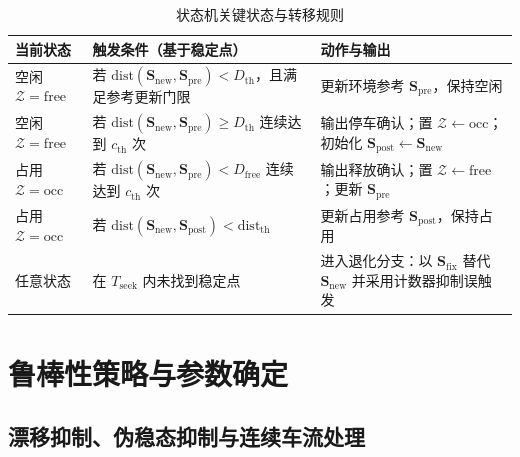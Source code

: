 \documentclass{xdupgthesis}
\begin{document}
\begin{table}[!htbp]
\centering
\small
\caption{状态机关键状态与转移规则}
\label{tab:ch4_fsm_rules}
\setlength{\tabcolsep}{5pt}
\renewcommand{\arraystretch}{1.18}
\begin{tabular}{p{2.8cm} p{7.8cm} p{3.9cm}}
\hline
当前状态 & 触发条件（基于稳定点） & 动作与输出 \\
\hline
空闲 $\mathcal{Z}=\mathrm{free}$ &
若 $\mathrm{dist}(\mathbf{S}_{\mathrm{new}},\mathbf{S}_{\mathrm{pre}})<D_{\mathrm{th}}$，且满足参考更新门限
&
更新环境参考 $\mathbf{S}_{\mathrm{pre}}$，保持空闲 \\
\hline
空闲 $\mathcal{Z}=\mathrm{free}$ &
若 $\mathrm{dist}(\mathbf{S}_{\mathrm{new}},\mathbf{S}_{\mathrm{pre}})\ge D_{\mathrm{th}}$ 连续达到 $c_{\mathrm{th}}$ 次
&
输出停车确认；置 $\mathcal{Z}\leftarrow\mathrm{occ}$；初始化 $\mathbf{S}_{\mathrm{post}}\leftarrow\mathbf{S}_{\mathrm{new}}$ \\
\hline
占用 $\mathcal{Z}=\mathrm{occ}$ &
若 $\mathrm{dist}(\mathbf{S}_{\mathrm{new}},\mathbf{S}_{\mathrm{pre}})<D_{\mathrm{free}}$ 连续达到 $c_{\mathrm{th}}$ 次
&
输出释放确认；置 $\mathcal{Z}\leftarrow\mathrm{free}$；更新 $\mathbf{S}_{\mathrm{pre}}$ \\
\hline
占用 $\mathcal{Z}=\mathrm{occ}$ &
若 $\mathrm{dist}(\mathbf{S}_{\mathrm{new}},\mathbf{S}_{\mathrm{post}})<\mathrm{dist}_{\mathrm{th}}$
&
更新占用参考 $\mathbf{S}_{\mathrm{post}}$，保持占用 \\
\hline
任意状态 &
在 $T_{\mathrm{seek}}$ 内未找到稳定点
&
进入退化分支：以 $\mathbf{S}_{\mathrm{fix}}$ 替代 $\mathbf{S}_{\mathrm{new}}$ 并采用计数器抑制误触发 \\
\hline
\end{tabular}
\end{table}

\section{鲁棒性策略与参数确定}
\label{sec:ch4_robust}

\subsection{漂移抑制、伪稳态抑制与连续车流处理}
\label{subsec:ch4_drift_gate}
\end{document}
